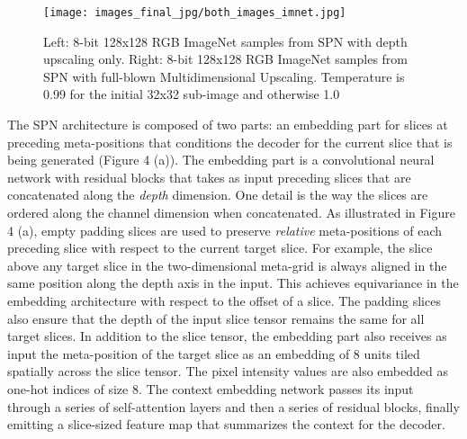 \documentclass{article} \usepackage{iclr2019_conference,times}
\begin{document}
\begin{figure}[ht]
  \begin{center}
    \texttt{[image: images\_final\_jpg/both\_images\_imnet.jpg]}
    \caption{Left: 8-bit 128x128 RGB ImageNet samples from SPN with depth upscaling only. Right:  8-bit 128x128 RGB ImageNet samples from SPN with full-blown Multidimensional Upscaling. Temperature is 0.99 for the initial 32x32 sub-image and otherwise 1.0}
    \label{fig:im128_updepthed}
  \end{center}
\end{figure}

The SPN architecture is composed of two parts: an embedding part for slices at preceding meta-positions that conditions the decoder for the current slice that is being generated (Figure 4 (a)). The embedding part is a convolutional neural network with residual blocks that takes as input preceding slices that are concatenated along the \emph{depth} dimension. One detail is the way the slices are ordered along the channel dimension when concatenated. As illustrated in Figure 4 (a), empty padding slices are used to preserve \emph{relative} meta-positions of each preceding slice with respect to the current target slice. For example, the slice above any target slice in the two-dimensional meta-grid is always aligned in the same position along the depth axis in the input. This achieves equivariance in the embedding architecture with respect to the  offset of a slice. The padding slices also ensure that the depth of the input slice tensor remains the same for all target slices. In addition to the slice tensor, the embedding part also receives as input the meta-position of the target slice as an embedding of 8 units tiled spatially across the slice tensor. The pixel intensity values are also embedded as one-hot indices of size 8. The context embedding network passes its input through a series of self-attention layers and then a series of residual blocks, finally emitting a slice-sized feature map  that summarizes the context for the decoder.
\end{document}

